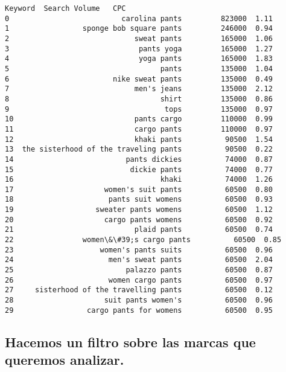 \documentclass[11pt]{article}
\makeatletter
\newcommand{\boxspacing}{\kern\kvtcb@left@rule\kern\kvtcb@boxsep}
\newcommand{\prompt}[4]{
        \ttfamily\llap{{\color{#2}[#3]:\hspace{3pt}#4}}\vspace{-\baselineskip}
    }
\makeatother
\begin{document}
            \begin{tcolorbox}[breakable, size=fbox, boxrule=.5pt, pad at break*=1mm, opacityfill=0]
\prompt{Out}{outcolor}{12}{\boxspacing}
\begin{Verbatim}[commandchars=\\\{\}]
                                  Keyword  Search Volume   CPC
0                          carolina pants         823000  1.11
1                 sponge bob square pants         246000  0.94
2                             sweat pants         165000  1.06
3                              pants yoga         165000  1.27
4                              yoga pants         165000  1.83
5                                   pants         135000  1.04
6                        nike sweat pants         135000  0.49
7                             men's jeans         135000  2.12
8                                   shirt         135000  0.86
9                                    tops         135000  0.97
10                            pants cargo         110000  0.99
11                            cargo pants         110000  0.97
12                            khaki pants          90500  1.54
13  the sisterhood of the traveling pants          90500  0.22
14                          pants dickies          74000  0.87
15                           dickie pants          74000  0.77
16                                  khaki          74000  1.26
17                     women's suit pants          60500  0.80
18                      pants suit womens          60500  0.93
19                   sweater pants womens          60500  1.12
20                     cargo pants womens          60500  0.92
21                            plaid pants          60500  0.74
22                women\&\#39;s cargo pants          60500  0.85
23                    women's pants suits          60500  0.96
24                      men's sweat pants          60500  2.04
25                          palazzo pants          60500  0.87
26                      women cargo pants          60500  0.97
27     sisterhood of the travelling pants          60500  0.12
28                     suit pants women's          60500  0.96
29                 cargo pants for womens          60500  0.95
\end{Verbatim}
\end{tcolorbox}
        
    \hypertarget{hacemos-un-filtro-sobre-las-marcas-que-queremos-analizar.}{%
\subsection{Hacemos un filtro sobre las marcas que queremos
analizar.}\label{hacemos-un-filtro-sobre-las-marcas-que-queremos-analizar.}}
\end{document}
